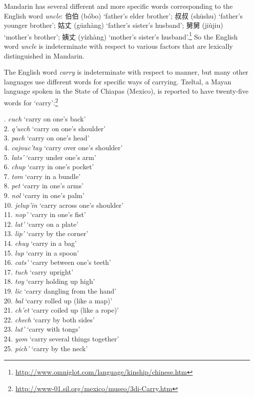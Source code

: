 Mandarin has several different and more specific words corresponding to the English word \textit{uncle}: 伯伯 (bóbo) ‘father’s elder brother’; 叔叔 (sh\=ushu) ‘father’s younger brother’; 姑丈 (g\=uzhàng) ‘father’s sister’s husband’; 舅舅 (jiùjiu) ‘mother’s brother’; 姨丈 (yízhàng) ‘mother’s sister’s husband’.\footnote{\url{http://www.omniglot.com/language/kinship/chinese.htm}}  So the English word \textit{uncle} is indeterminate with respect to various factors that are lexically distinguished in Mandarin.



The English word \textit{carry} is indeterminate with respect to manner, but many other languages use different words for specific ways of carrying. Tzeltal, a Mayan language spoken in the State of Chiapas (Mexico), is reported to have twenty-five words for ‘carry’:\footnote{\url{http://www-01.sil.org/mexico/museo/3di-Carry.htm}} 


. \textit{cuch} ‘carry on one’s back’\\
2. \textit{q'uech} ‘carry on one’s shoulder’ \\
3. \textit{pach} ‘carry on one’s head’ \\
4. \textit{cajnuc'tay} ‘carry over one’s shoulder’\\
5. \textit{lats'} ‘carry under one’s arm’\\
6. \textit{chup} ‘carry in one’s pocket’\\
7. \textit{tom} ‘carry in a bundle’\\
8. \textit{pet} ‘carry in one’s arms’\\
9. \textit{nol} ‘carry in one’s palm’\\
10. \textit{jelup'in} ‘carry across one’s shoulder’\\
11. \textit{nop'} ‘carry in one’s fist’\\
12. \textit{lat'} ‘carry on a plate’\\
13. \textit{lip'} ‘carry by the corner’\\
14. \textit{chuy} ‘carry in a bag’\\
15. \textit{lup} ‘carry in a spoon’\\
16. \textit{cats'} ‘carry between one’s teeth’\\
17. \textit{tuch} ‘carry upright’\\
18. \textit{toy} ‘carry holding up high’\\
19. \textit{lic} ‘carry dangling from the hand’\\
20. \textit{bal} ‘carry rolled up (like a map)’\\
21. \textit{ch'et} ‘carry coiled up (like a rope)’\\
22. \textit{chech} ‘carry by both sides’\\
23. \textit{lut'} ‘carry with tongs’\\
24. \textit{yom} ‘carry several things together’\\
25. \textit{pich'} ‘carry by the neck’
\z


